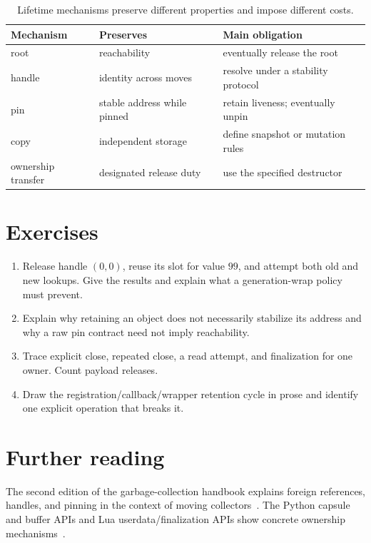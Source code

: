 \begin{table}[htbp]
\caption{Lifetime mechanisms preserve different properties and impose different costs.}
\label{tab:ch72-policies}
\centering
\begin{tabular}{lll}
\toprule
Mechanism & Preserves & Main obligation \\
\midrule
root & reachability & eventually release the root \\
handle & identity across moves & resolve under a stability protocol \\
pin & stable address while pinned & retain liveness; eventually unpin \\
copy & independent storage & define snapshot or mutation rules \\
ownership transfer & designated release duty & use the specified destructor \\
\bottomrule
\end{tabular}
\end{table}

\section{Exercises}
\label{sec:ch72-exercises}
\begin{enumerate}
\item\label{ex:ch72-generation} Release handle $(0,0)$, reuse its slot for value $99$, and attempt both old and new lookups.
Give the results and explain what a generation-wrap policy must prevent.
\item\label{ex:ch72-pin} Explain why retaining an object does not necessarily stabilize its address and why a raw pin contract need not imply reachability.
\item\label{ex:ch72-close} Trace explicit close, repeated close, a read attempt, and finalization for one owner.
Count payload releases.
\item\label{ex:ch72-cycle} Draw the registration/callback/wrapper retention cycle in prose and identify one explicit operation that breaks it.
\end{enumerate}

\section{Further reading}
\label{sec:ch72-reading}
The second edition of the garbage-collection handbook explains foreign references, handles, and pinning in the context of moving collectors~\cite{jones-2023-garbage}.
The Python capsule and buffer APIs and Lua userdata/finalization APIs show concrete ownership mechanisms~\cite{python-2026-capi,ierusalimschy-2026-lua}.
